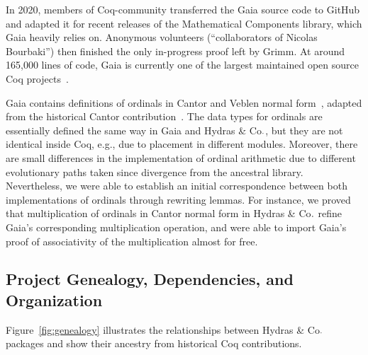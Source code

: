 \documentclass{easychair}
\newcommand{\coq}{Coq\xspace}
\newcommand{\community}{Coq-community\xspace}
\newcommand{\gaia}{Gaia\xspace}
\newcommand{\Hydras}{Hydras \& Co$\text.$\xspace}
\begin{document}
In 2020, members of \community transferred the \gaia source code to GitHub and adapted it for recent releases of the Mathematical Components library, which \gaia heavily relies on. Anonymous volunteers (``collaborators of Nicolas Bourbaki'') then finished the only in-progress proof left by Grimm. At around 165,000 lines of code, \gaia is currently one of the largest maintained open source \coq projects~\cite{Gaia}.

\gaia contains definitions of ordinals in Cantor and Veblen normal form~\cite{grimm:hal-00911710}, adapted from the historical Cantor contribution~\cite{CantorContrib}. The data types for ordinals are essentially defined the same way in Gaia and \Hydras, but they are not identical inside \coq, e.g., due to placement in different modules. Moreover, there are small differences in the implementation of ordinal arithmetic due to different evolutionary paths taken since divergence from the ancestral library.
%
Nevertheless, we were able to establish an initial correspondence between both implementations of ordinals through rewriting lemmas. For instance, we proved that multiplication of ordinals in Cantor normal form in \Hydras refine Gaia's corresponding multiplication operation, and were able to import Gaia's proof of associativity of the multiplication almost for free.

\subsection{Project Genealogy, Dependencies, and Organization}

Figure~\ref{fig:genealogy} illustrates the relationships between \Hydras packages and show their ancestry from historical Coq contributions.
\end{document}
